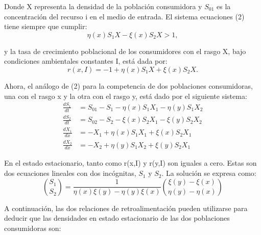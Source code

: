 \documentclass[letterpaper]{article}
\begin{document}
{        \normalsize{Donde X representa la densidad de la población consumidora y $S_{01}$ es la concentración del recurso i en el medio de entrada.
        El sistema ecuaciones (2) tiene siempre que cumplir:}\\

        \begin{equation}
            \eta(x)S_1X-\xi(x)S_2X>1,
        \end{equation}

        \normalsize{y la tasa de crecimiento poblacional de los consumidores con el rasgo X, bajo condiciones ambientales constantes I, está dada por:}\\

        \begin{equation}
            r(x,I)=-1+\eta(x)S_1X+\xi(x)S_2X.
        \end{equation}

        \normalsize{Ahora, el análogo de (2) para la competencia de dos poblaciones consumidoras, una con el rasgo x y la otra con el rasgo y, está dado por el siguiente sistema:}\\

        \begin{equation}
        \begin{split}
            \frac{d S_1}{dt}&=S_{01}-S_1-\eta(x)S_1X_1-\eta(y)S_1X_2\\  \frac{d S_2}{dt}&=S_{02}-S_2-\xi(x)S_2X_1-\xi(y)S_2X_2\\ \frac{d X_1}{dx}&=-X_1+\eta(x)S_1X_1+\xi(x)S_2X_1\\
            \frac{d X_2}{dx}&=-X_2+\eta(y)S_1X_2+\xi(y)S_2X_1
        \end{split}
        \end{equation}

        \normalsize{En el estado estacionario, tanto como r(x,I) y r(y,I) son iguales a cero. Estas son dos ecuaciones lineales con dos incógnitas, $S_1$ y $S_2$. La solución se expresa como:}\\

        \begin{equation}
            \binom{S_1}{S_2}=\frac{1}{\eta(x)\xi(y)-\eta(y)\xi(x)}\binom{\xi(y)-\xi(x)}{\eta(y)-\eta(x)}
        \end{equation}

        
        \normalsize{A continuación, las dos relaciones de retroalimentación pueden utilizarse para deducir que las densidades en estado estacionario de las dos poblaciones consumidoras son:}\\

}
\end{document}

